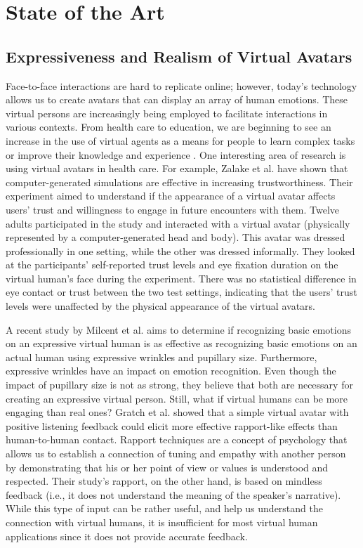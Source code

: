 \section{State of the Art}

\subsection{Expressiveness and Realism of Virtual Avatars}
Face-to-face interactions are hard to replicate online; however, today's technology allows us to create avatars that can display an array of human emotions. These virtual persons are increasingly being employed to facilitate interactions in various contexts. From health care to education, we are beginning to see an increase in the use of virtual agents as a means for people to learn complex tasks or improve their knowledge and experience \cite{MAR18, SHO19}. One interesting area of research is using virtual avatars in health care. For example, Zalake et al. \cite{ZAL18} have shown that computer-generated simulations are effective in increasing trustworthiness. Their experiment aimed to understand if the appearance of a virtual avatar affects users' trust and willingness to engage in future encounters with them. Twelve adults participated in the study and interacted with a virtual avatar (physically represented by a computer-generated head and body). This avatar was dressed professionally in one setting, while the other was dressed informally. They looked at the participants' self-reported trust levels and eye fixation duration on the virtual human's face during the experiment. There was no statistical difference in eye contact or trust between the two test settings, indicating that the users' trust levels were unaffected by the physical appearance of the virtual avatars.

A recent study by Milcent et al. \cite{MIL19} aims to determine if recognizing basic emotions on an expressive virtual human is as effective as recognizing basic emotions on an actual human using expressive wrinkles and pupillary size. Furthermore, expressive wrinkles have an impact on emotion recognition. Even though the impact of pupillary size is not as strong, they believe that both are necessary for creating an expressive virtual person. 
Still, what if virtual humans can be more engaging than real ones? Gratch et al. \cite{GRA07} showed that a simple virtual avatar with positive listening feedback could elicit more effective rapport-like effects than human-to-human contact. Rapport techniques are a concept of psychology that allows us to establish a connection of tuning and empathy with another person by demonstrating that his or her point of view or values is understood and respected. Their study's rapport, on the other hand, is based on mindless feedback (i.e., it does not understand the meaning of the speaker's narrative). While this type of input can be rather useful, and help us understand the connection with virtual humans, it is insufficient for most virtual human applications since it does not provide accurate feedback.

